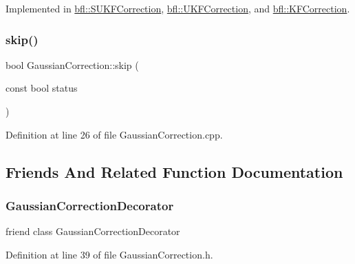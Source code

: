 Implemented in \mbox{\hyperlink{classbfl_1_1SUKFCorrection_a3217ddd6a205ff94de69e3b6d8de1fbe}{bfl\+::\+S\+U\+K\+F\+Correction}}, \mbox{\hyperlink{classbfl_1_1UKFCorrection_a3d1317c9f594540e68748c31b22ea31e}{bfl\+::\+U\+K\+F\+Correction}}, and \mbox{\hyperlink{classbfl_1_1KFCorrection_a52dbdd94e4ff2472654706a397764088}{bfl\+::\+K\+F\+Correction}}.

\mbox{\label{classbfl_1_1GaussianCorrection_a986b05b149650ea4dd725b10700db57f}} 
\subsubsection{\texorpdfstring{skip()}{skip()}}
{\footnotesize\ttfamily bool Gaussian\+Correction\+::skip (\begin{DoxyParamCaption}\item[{const bool}]{status }\end{DoxyParamCaption})}



Definition at line 26 of file Gaussian\+Correction.\+cpp.



\subsection{Friends And Related Function Documentation}
\mbox{\label{classbfl_1_1GaussianCorrection_a78bd8d7a082c77910c4ce95135781e2c}} 
\subsubsection{\texorpdfstring{Gaussian\+Correction\+Decorator}{GaussianCorrectionDecorator}}
{\footnotesize\ttfamily friend class Gaussian\+Correction\+Decorator\hspace{0.3cm}{\ttfamily [friend]}}



Definition at line 39 of file Gaussian\+Correction.\+h.

